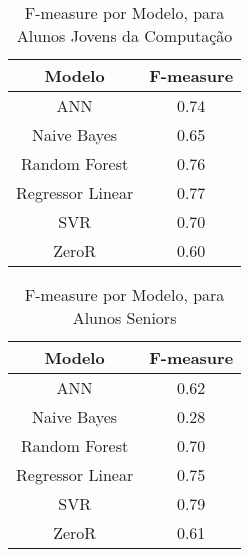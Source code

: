 \begin{table}
\begin{center}
\begin{tabular}[c]{| c | c |}
    \hline
    \textbf{Modelo} & \textbf{F-measure} \\
    \hline
    ANN              & 0.74 \\
    \hline
    Naive Bayes      & 0.65 \\
    \hline
    Random Forest    & 0.76 \\
    \hline
    Regressor Linear & 0.77 \\
    \hline
    SVR              & 0.70 \\
    \hline
    ZeroR            & 0.60 \\
    \hline
\end{tabular}
\end{center}
\caption{F-measure por Modelo, para Alunos Jovens da Computação}
\end{table}

\begin{table}
\begin{center}
\begin{tabular}[c]{| c | c |}
    \hline
    \textbf{Modelo} & \textbf{F-measure} \\
    \hline
    ANN              & 0.62 \\
    \hline
    Naive Bayes      & 0.28 \\
    \hline
    Random Forest    & 0.70 \\
    \hline
    Regressor Linear & 0.75 \\
    \hline
    SVR              & 0.79 \\
    \hline
    ZeroR            & 0.61 \\
    \hline
\end{tabular}
\end{center}
\caption{F-measure por Modelo, para Alunos Seniors}
\end{table}

